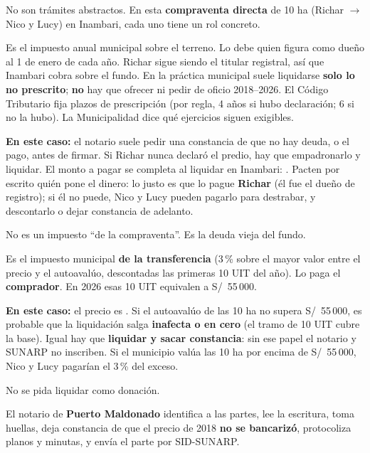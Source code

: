 \documentclass[12pt,a4paper]{article}
\begin{document}


\noindent No son trámites abstractos. En esta \textbf{compraventa directa} de 10 ha (Richar $\rightarrow$ Nico y Lucy) en Inambari, cada uno tiene un rol concreto.

Es el impuesto anual municipal sobre el terreno. Lo debe quien figura como dueño al 1 de enero de cada año. Richar sigue siendo el titular registral, así que Inambari cobra sobre el fundo. En la práctica municipal suele liquidarse \textbf{solo lo no prescrito}; \textbf{no} hay que ofrecer ni pedir de oficio 2018--2026. El Código Tributario fija plazos de prescripción (por regla, 4 años si hubo declaración; 6 si no la hubo). La Municipalidad dice qué ejercicios siguen exigibles.

\textbf{En este caso:} el notario suele pedir una constancia de que no hay deuda, o el pago, antes de firmar. Si Richar nunca declaró el predio, hay que empadronarlo y liquidar. El monto a pagar se completa al liquidar en Inambari: \DeudaPredialReferencia. Pacten por escrito quién pone el dinero: lo justo es que lo pague \textbf{Richar} (él fue el dueño de registro); si él no puede, Nico y Lucy pueden pagarlo para destrabar, y descontarlo o dejar constancia de adelanto.

No es un impuesto ``de la compraventa''. Es la deuda vieja del fundo.

Es el impuesto municipal \textbf{de la transferencia} (3\,\% sobre el mayor valor entre el precio y el autoavalúo, descontadas las primeras 10 UIT del año). Lo paga el \textbf{comprador}. En 2026 esas 10 UIT equivalen a S/\ 55\,000.

\textbf{En este caso:} el precio es \MontoPago. Si el autoavalúo de las 10 ha no supera S/\ 55\,000, es probable que la liquidación salga \textbf{inafecta o en cero} (el tramo de 10 UIT cubre la base). Igual hay que \textbf{liquidar y sacar constancia}: sin ese papel el notario y SUNARP no inscriben. Si el municipio valúa las 10 ha por encima de S/\ 55\,000, Nico y Lucy pagarían el 3\,\% del exceso.

No se pida liquidar como donación.

El notario de \textbf{Puerto Maldonado} identifica a las partes, lee la escritura, toma huellas, deja constancia de que el precio de 2018 \textbf{no se bancarizó}, protocoliza planos y minutas, y envía el parte por SID-SUNARP.
\end{document}
